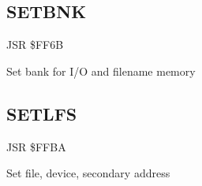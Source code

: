 
\newpage
\subsection{SETBNK}
\label{KERNAL Jump Table!SETBNK}
\begin{description}[leftmargin=2cm,style=nextline]
    \item [Address:] JSR \$FF6B
    \item [Description:] Set bank for I/O and filename memory
    \item [Inputs:]
    \item [Outputs:]
    \item [Remarks:]
    \item [Example:]
\end{description}



\newpage
\subsection{SETLFS}
\label{KERNAL Jump Table!SETLFS}
\begin{description}[leftmargin=2cm,style=nextline]
    \item [Address:] JSR \$FFBA
    \item [Description:] Set file, device, secondary address
    \item [Inputs:]
    \item [Outputs:]
    \item [Remarks:]
    \item [Example:]
\end{description}



\newpage
